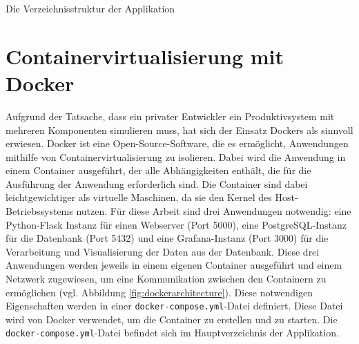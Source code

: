 \begin{marginfigure}
    \centering
    \begin{adjustbox}{width=\textwidth}
    \end{adjustbox}
    \caption{Die Verzeichnisstruktur der Applikation}
    \label{fig:dirstructure}
\end{marginfigure}

\section{Containervirtualisierung mit Docker}
Aufgrund der Tatsache, dass ein privater Entwickler ein Produktivsystem mit mehreren Komponenten simulieren muss, hat sich der Einsatz Dockers als sinnvoll erwiesen. Docker ist eine Open-Source-Software, die es ermöglicht, Anwendungen mithilfe von Containervirtualisierung zu isolieren. Dabei wird die Anwendung in einem Container ausgeführt, der alle Abhängigkeiten enthält, die für die Ausführung der Anwendung erforderlich sind. Die Container sind dabei leichtgewichtiger als virtuelle Maschinen, da sie den Kernel des Host-Betriebssystems nutzen. Für diese Arbeit sind drei Anwendungen notwendig: eine Python-Flask Instanz für einen Webserver (Port 5000), eine PostgreSQL-Instanz für die Datenbank (Port 5432) und eine Grafana-Instanz (Port 3000) für die Verarbeitung und Visualisierung der Daten aus der Datenbank. Diese drei Anwendungen werden jeweils in einem eigenen Container ausgeführt und einem Netzwerk zugewiesen, um eine Kommunikation zwischen den Containern zu ermöglichen (vgl. Abbildung \ref{fig:dockerarchitecture}). Diese notwendigen Eigenschaften werden in einer \texttt{docker-compose.yml}-Datei definiert. Diese Datei wird von Docker verwendet, um die Container zu erstellen und zu starten. Die \texttt{docker-compose.yml}-Datei befindet sich im Hauptverzeichnis der Applikation.

